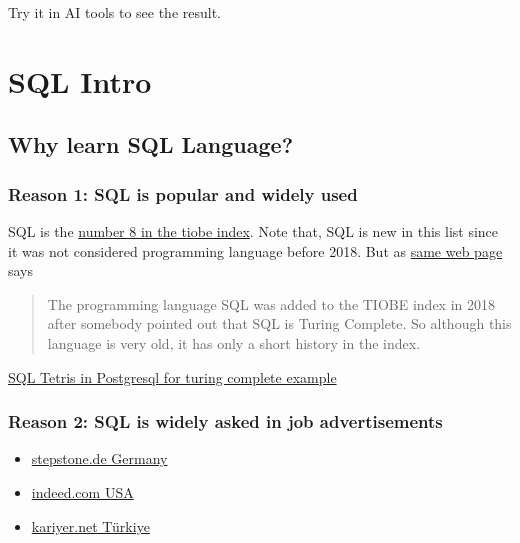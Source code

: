 \documentclass[
  letterpaper,
  DIV=11,
  numbers=noendperiod]{scrreprt}
\providecommand{\tightlist}{%
  \setlength{\itemsep}{0pt}\setlength{\parskip}{0pt}}\usepackage{longtable,booktabs,array}
\begin{document}
Try it in AI tools to see the result.

\part{SQL Intro}

\chapter{Why learn SQL Language?}\label{why-learn-sql-language}

\section*{Reason 1: SQL is popular and widely
used}\label{reason-1-sql-is-popular-and-widely-used}


SQL is the \href{https://www.tiobe.com/tiobe-index/sql/}{number 8 in the
tiobe index}. Note that, SQL is new in this list since it was not
considered programming language before 2018. But as
\href{https://www.tiobe.com/tiobe-index/}{same web page} says

\begin{quote}
The programming language SQL was added to the TIOBE index in 2018 after
somebody pointed out that SQL is Turing Complete. So although this
language is very old, it has only a short history in the index.
\end{quote}

\href{https://github.com/nuno-faria/tetris-sql}{SQL Tetris in Postgresql
for turing complete example}

\section*{Reason 2: SQL is widely asked in job
advertisements}\label{reason-2-sql-is-widely-asked-in-job-advertisements}


\begin{itemize}
\tightlist
\item
  \href{https://www.stepstone.de/work/sql?searchOrigin=Homepage_top-search}{stepstone.de
  Germany}
\item
  \href{https://www.indeed.com/jobs?q=sql&fromage=last&sc=0kf\%3Aattr\%28FGY89\%29\%3B&vjk=24f6984f2ffca44a}{indeed.com
  USA}
\item
  \href{https://www.kariyer.net/is-ilanlari?kw=sql}{kariyer.net Türkiye}
\end{itemize}
\end{document}
